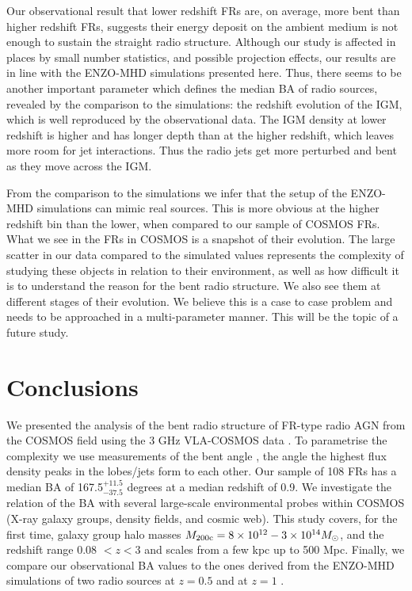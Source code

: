 \documentclass[galaxies,article,submit,moreauthors,pdftex]{Definitions/mdpi}
\begin{document}
Our observational result that lower redshift FRs are, on average, more bent than higher redshift FRs, suggests their energy deposit on the ambient medium is not enough to sustain the straight radio structure. Although our study is affected in places by small number statistics, and possible projection effects, our results are in line with the ENZO-MHD simulations \citep{vazza21} presented here. Thus, there seems to be another important parameter which defines the median BA of radio sources, revealed by the comparison to the simulations: the redshift evolution of the IGM, which is well reproduced by the observational data. The IGM density at lower redshift is higher and has longer depth than at the higher redshift, which leaves more room for jet interactions. Thus the radio jets get more perturbed and bent as they move across the IGM.

From the comparison to the simulations \citep{vazza21} we infer that the setup of the ENZO-MHD simulations can mimic real sources. This is more obvious at the higher redshift bin than the lower, when compared to our sample of COSMOS FRs. What we see in the FRs in COSMOS is a snapshot of their evolution. The large scatter in our data compared to the simulated values represents the complexity of studying these objects in relation to their environment, as well as how difficult it is to understand the reason for the bent radio structure. We also see them at different stages of their evolution. We believe this is a case to case problem and needs to be approached in a multi-parameter manner. This will be the topic of a future study. 


\section{Conclusions}

We presented the analysis of the bent radio structure of FR-type radio AGN from the COSMOS field using the 3 GHz VLA-COSMOS data \citep{smolcic17a,vardoulaki21}. To parametrise the complexity we use measurements of the bent angle \citep{vardoulaki21}, the angle the highest flux density peaks in the lobes/jets form to each other. Our sample of 108 FRs has a median BA of 167.5$^{+11.5}_{-37.5}$ degrees at a median redshift of 0.9. We investigate the relation of the BA with several large-scale environmental probes within COSMOS (X-ray galaxy groups, density fields, and cosmic web). This study covers, for the first time, galaxy group halo masses $M_{\rm 200c} = 8 \times 10^{12} - 3 \times 10^{14} M_{\odot}$, and the redshift range 0.08 $< z < 3$ and scales from a few kpc up to 500 Mpc. Finally, we compare our observational BA values to the ones derived from the ENZO-MHD simulations of two radio sources at $z = 0.5$ and at $z = 1$ \cite{vazza21}.
\end{document}

